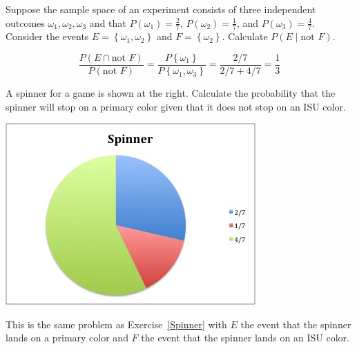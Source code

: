 \documentclass[12pt]{exam}
\begin{document}
\begin{questions}

\question\label{Spinner} Suppose the sample space of an experiment
consists of three independent
outcomes $\omega_1,\omega_2,\omega_3$ and that
$P\left(\omega_1\right)=\frac{2}{7}$, $P\left(\omega_2\right)=\frac{1}{7}$,
and $P\left(\omega_3\right)=\frac{4}{7}$. Consider the events
$E=\left\{\omega_1,\omega_2\right\}$ and $F=\left\{\omega_2\right\}$.
Calculate $P\left(E\mid\text{not $F$}\right)$.
\begin{solution}
\[\frac{P\left(E\cap\text{not $F$}\right)}
{P\left(\text{not $F$}\right)}
=\frac{P\left\{\omega_1\right\}}{P\left\{\omega_1,\omega_3\right\}}
=\frac{2/7}{2/7+4/7}=\frac{1}{3}\]
\end{solution}

\begin{multicols}{2}
\question A spinner for a game is shown at the right.
Calculate the probability that the spinner will stop
on a primary color given that it does not stop on an ISU color.
\begin{center}\includegraphics[scale=.6]{ReviewSpinner}\end{center}
\end{multicols}
\begin{solution} This is the same problem as Exercise~\ref{Spinner}
with $E$ the event that the spinner lands on a primary
color and $F$ the event that the spinner lands on an ISU color.
\end{solution}


\end{questions}
\end{document}
